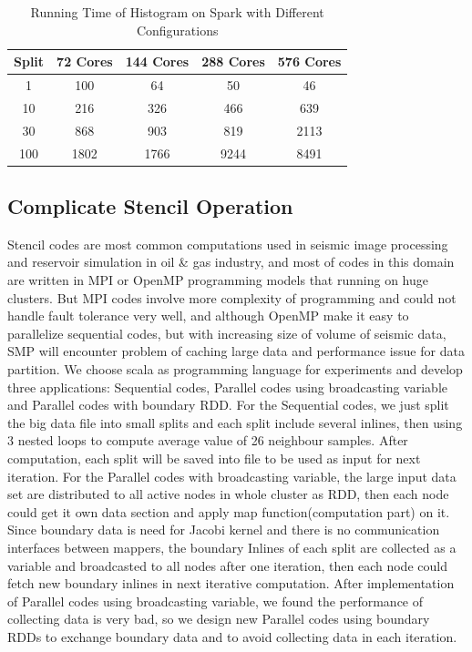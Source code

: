 
\begin{table}[H]
\caption{Running Time of Histogram on Spark with Different Configurations}
\centering
\begin{tabular}{||c| c c c c ||} 
 \hline
 Split & 72 Cores & 144 Cores & 288 Cores & 576 Cores \\ 
 \hline
  1 & 100 &	64 & 50 & 46 \\
  10 & 216 &	326 & 466 & 639 \\
  30 & 868 &	903 & 819 & 2113 \\
  100 & 1802 & 1766 & 9244 & 8491 \\
 \hline
\end{tabular}
\label{table:HistSpark}
\end{table}

\subsection{Complicate Stencil Operation}

Stencil codes are most common computations used in seismic image processing and reservoir simulation in oil \& gas industry, and most of codes in this domain are written in MPI or OpenMP programming models that running on huge clusters. But MPI codes involve more complexity of programming and could not handle fault tolerance very well, and although OpenMP make it easy to parallelize sequential codes, but with increasing size of volume of seismic data, SMP will encounter problem of caching large data and performance issue for data partition. 
We choose scala as programming language for experiments and develop three applications: Sequential codes, Parallel codes using broadcasting variable and Parallel codes with boundary RDD. For the Sequential codes, we just split the big data file into small splits and each split include several inlines, then using 3 nested loops to compute average value of 26 neighbour samples. After computation, each split will be saved into file to be used as input for next iteration. For the Parallel codes with broadcasting variable, the large input data set are distributed to all active nodes in whole cluster as RDD, then each node could get it own data section and apply map function(computation part) on it. Since boundary data is need for Jacobi kernel and there is no communication interfaces between mappers, the boundary Inlines of each split are collected as a variable and broadcasted to all nodes after one iteration, then each node could fetch new boundary inlines in next iterative computation. After implementation of Parallel codes using broadcasting variable, we found the performance of collecting data is very bad, so we design new Parallel codes using boundary RDDs to exchange boundary data and to avoid collecting data in each iteration. 

